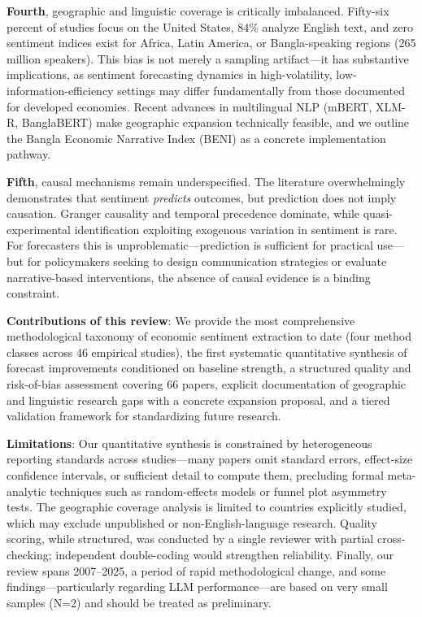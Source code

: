 \documentclass[11pt,twocolumn]{article}
\begin{document}
\textbf{Fourth}, geographic and linguistic coverage is critically imbalanced. Fifty-six percent of studies focus on the United States, 84\% analyze English text, and zero sentiment indices exist for Africa, Latin America, or Bangla-speaking regions (265 million speakers). This bias is not merely a sampling artifact---it has substantive implications, as sentiment forecasting dynamics in high-volatility, low-information-efficiency settings may differ fundamentally from those documented for developed economies. Recent advances in multilingual NLP (mBERT, XLM-R, BanglaBERT) make geographic expansion technically feasible, and we outline the Bangla Economic Narrative Index (BENI) as a concrete implementation pathway.

\textbf{Fifth}, causal mechanisms remain underspecified. The literature overwhelmingly demonstrates that sentiment \emph{predicts} outcomes, but prediction does not imply causation. Granger causality and temporal precedence dominate, while quasi-experimental identification exploiting exogenous variation in sentiment is rare. For forecasters this is unproblematic---prediction is sufficient for practical use---but for policymakers seeking to design communication strategies or evaluate narrative-based interventions, the absence of causal evidence is a binding constraint.

\textbf{Contributions of this review}: We provide the most comprehensive methodological taxonomy of economic sentiment extraction to date (four method classes across 46 empirical studies), the first systematic quantitative synthesis of forecast improvements conditioned on baseline strength, a structured quality and risk-of-bias assessment covering 66 papers, explicit documentation of geographic and linguistic research gaps with a concrete expansion proposal, and a tiered validation framework for standardizing future research.

\textbf{Limitations}: Our quantitative synthesis is constrained by heterogeneous reporting standards across studies---many papers omit standard errors, effect-size confidence intervals, or sufficient detail to compute them, precluding formal meta-analytic techniques such as random-effects models or funnel plot asymmetry tests. The geographic coverage analysis is limited to countries explicitly studied, which may exclude unpublished or non-English-language research. Quality scoring, while structured, was conducted by a single reviewer with partial cross-checking; independent double-coding would strengthen reliability. Finally, our review spans 2007--2025, a period of rapid methodological change, and some findings---particularly regarding LLM performance---are based on very small samples (N=2) and should be treated as preliminary.
\end{document}

